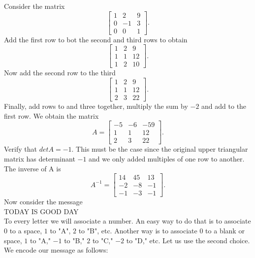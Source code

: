 \documentclass[../main.tex]{subfiles}
\begin{document}
\begin{example}
  Consider the matrix
  \begin{equation*}
    \begin{bmatrix}
      1 & 2 & 9\\
      0 & -1 & 3\\
      0 & 0 & 1
    \end{bmatrix}.
  \end{equation*}
  Add the first row to bot the second and third rows to obtain
  \begin{equation*}
    \begin{bmatrix}
      1 & 2 & 9\\
      1 & 1 & 12\\
      1 & 2 & 10
    \end{bmatrix}.
  \end{equation*}
  Now add the second row to the third
  \begin{equation*}
    \begin{bmatrix}
      1 & 2 & 9\\
      1 & 1 & 12\\
      2 & 3 & 22
    \end{bmatrix}.
  \end{equation*}
  Finally, add rows to and three together, multiply the sum by \(-2\) and add to the first row. We obtain the matrix
  \begin{equation*}
    A= \begin{bmatrix}
      -5 & -6 & -59\\
      1 & 1 & 12\\
      2 & 3 & 22
    \end{bmatrix}.
  \end{equation*}
  Verify that \(detA = -1\). This must be the case since the original upper triangular matrix has determinant \(-1\) and we only added multiples of one row to another.  The inverse of A is
  \begin{equation*}
    A^{-1}= \begin{bmatrix}
      14 & 45 & 13\\
      -2 & -8 & -1\\
      -1 & -3 & -1
    \end{bmatrix}.
  \end{equation*}
  Now consider the message\\
  \indent TODAY IS GOOD DAY\\
  To every letter we will associate a number. An easy way to do that is to associate \(0\) to a space, \(1\) to "A", \(2\) to "B", etc. Another way is to associate 0 to a blank or space, \(1\) to "A," \(-1\) to "B," \(2\) to "C," \(-2\) to "D," etc. Let us use the second choice. We encode our message as follows:

\end{example}
\end{document}

